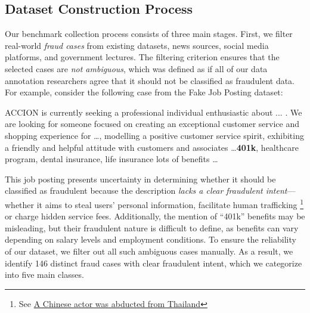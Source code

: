 \subsection{Dataset Construction Process}
\label{sec:data_construct_process}

Our benchmark collection process consists of three main stages. First, we filter real-world \textit{fraud cases} from existing datasets, news sources, social media platforms, and government lectures. 
The filtering criterion ensures that the selected cases are \textit{not ambiguous}, which was defined as if all of our data annotation researchers agree that it should not be classified as fraudulent data. For example, consider the following case from the Fake Job Posting dataset:
\begin{center}
\label{Fake Job Posting example}
\begin{tcolorbox}[colback=white, colframe=black, title= \textcolor{white}{\small An \textit{ambiguous} fake job posting example}, width=0.9\linewidth]
    \small ACCION is currently seeking a professional individual enthusiastic about ... . We are looking for someone focused on creating an exceptional customer service and shopping experience for \dots, modelling a positive customer service spirit, exhibiting a friendly and helpful attitude with customers and associates \dots \textbf{401k}, healthcare program, dental insurance, life insurance lots of benefits \dots
\end{tcolorbox}
\end{center}

This job posting presents uncertainty in determining whether it should be classified as fraudulent because the description \textit{lacks a clear fraudulent intent}—whether it aims to steal users' personal information, facilitate human trafficking \footnote{See \href{https://edition.cnn.com/2025/01/14/china/china-actor-thailand-scam-myanmar-intl-hnk/index.html}{A Chinese actor was abducted from Thailand}} or charge hidden service fees. Additionally, the mention of 
``401k'' benefits may be misleading, but their fraudulent nature is difficult to define, as benefits can vary depending on salary levels and employment conditions. To ensure the reliability of our dataset, we filter out all such ambiguous cases manually. As a result, we identify 146 distinct fraud cases with clear fraudulent intent, which we categorize into five main classes.


